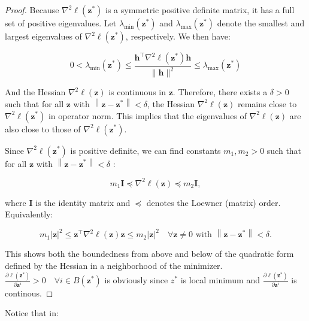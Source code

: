 \documentclass{article}
\theoremstyle{plain}
\theoremstyle{definition}
\def \I {\mathbf{I}}
\def \I {\mathbf{I}}
\begin{document}
\begin{proof}
Because $\nabla^2 \ell\left(\mathbf{z}^*\right)$ is a symmetric positive definite matrix, it has a full set of positive eigenvalues. Let $\lambda_{\min }\left(\mathbf{z}^*\right)$ and $\lambda_{\max }\left(\mathbf{z}^*\right)$ denote the smallest and largest eigenvalues of $\nabla^2 \ell\left(\mathbf{z}^*\right)$, respectively. We then have:

\[
  0<\lambda_{\min }\left(\mathbf{z}^*\right) \leq \frac{\mathbf{h}^{\top} \nabla^2 \ell\left(\mathbf{z}^*\right) \mathbf{h}}{\|\mathbf{h}\|^2} \leq \lambda_{\max }\left(\mathbf{z}^*\right)
\]

And the Hessian $\nabla^2 \ell(\mathbf{z})$ is continuous in $\mathbf{z}$. Therefore, there exists a $\delta>0$ such that for all $\mathbf{z}$ with $\left\|\mathbf{z}-\mathbf{z}^*\right\|<\delta$, the Hessian $\nabla^2 \ell(\mathbf{z})$ remains close to $\nabla^2 \ell\left(\mathbf{z}^*\right)$ in operator norm. This implies that the eigenvalues of $\nabla^2 \ell(\mathbf{z})$ are also close to those of $\nabla^2 \ell\left(\mathbf{z}^*\right)$.

Since $\nabla^2 \ell\left(\mathbf{z}^*\right)$ is positive definite, we can find constants $m_1, m_2>0$ such that for all $\mathbf{z}$ with $\left\|\mathbf{z}-\mathbf{z}^*\right\|<\delta$ :

\[
  m_1 \I \preceq \nabla^2 \ell(\mathbf{z}) \preceq m_2 \I,
\]

where $\I$ is the identity matrix and $\preceq$ denotes the Loewner (matrix) order. Equivalently:

\[
  m_1|\mathbf{z}|^2 \leq \mathbf{z}^{\top} \nabla^2 \ell(\mathbf{z}) \mathbf{z} \leq m_2|\mathbf{z}|^2 \quad \forall \mathbf{z} \neq 0 \text { with }\left\|\mathbf{z}-\mathbf{z}^*\right\|<\delta.
\]


This shows both the boundedness from above and below of the quadratic form defined by the Hessian in a neighborhood of the minimizer. $\frac{\partial \ell\left(\mathbf{z}^*\right)}{\partial \mathbf{z}^i}>0 \quad \forall i \in B\left(\mathbf{z}^*\right)$ is obviously since $z^*$ is local minimum and $\frac{\partial \ell\left(\mathbf{z}^*\right)}{\partial \mathbf{z}^i}$ is continous.



\end{proof}








Notice that in: 
\end{document}
